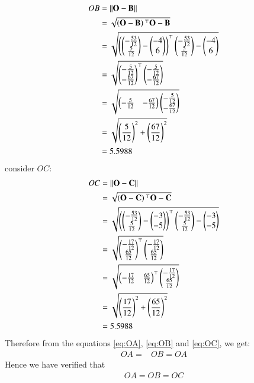 \documentclass[journal,12pt,twocolumn]{IEEEtran}
\theoremstyle{remark}
\begin{document}
\begin{align} 
OB &= \left\lVert\mathbf{O} - \mathbf{B}\right\rVert\\
&= \sqrt{\left(\mathbf{O}-\mathbf{B}\right){^\top}\mathbf{O}-\mathbf{B}}\\
&= \sqrt{\left(\begin{pmatrix}-\frac{53}{12} \\ \frac{5}{12}\end{pmatrix} - \begin{pmatrix}-4\\6\end{pmatrix}\right)^{\top}\begin{pmatrix}-\frac{53}{12}\\\frac{5}{12}\end{pmatrix} - \begin{pmatrix}-4\\6\end{pmatrix}}\\
&= \sqrt{\begin{pmatrix}-\frac{5}{12} \\ -\frac{67}{12}\end{pmatrix}^{\top}\begin{pmatrix}-\frac{5}{12} \\ -\frac{67}{12}\end{pmatrix}}\\
&= \sqrt{\begin{pmatrix}-\frac{5}{12} & -\frac{67}{12}\end{pmatrix} \begin{pmatrix}-\frac{5}{12} \\ -\frac{67}{12}\end{pmatrix}}\\
&= \sqrt{\left(\frac{5}{12}\right)^2 + \left(\frac{67}{12}\right)^2}\\
&= 5.5988 \label{eq:OB}
\end{align}
consider $OC$:
\begin{align} 
OC &= \left\lVert\mathbf{O} - \mathbf{C}\right\rVert\\
&= \sqrt{\left(\mathbf{O}-\mathbf{C}\right){^\top}\mathbf{O}-\mathbf{C}}\\
&= \sqrt{\left(\begin{pmatrix}-\frac{53}{12} \\ \frac{5}{12}\end{pmatrix} - \begin{pmatrix}-3\\-5\end{pmatrix}\right)^{\top}\begin{pmatrix}-\frac{53}{12}\\\frac{5}{12}\end{pmatrix} - \begin{pmatrix}-3\\-5\end{pmatrix}}\\
&= \sqrt{\begin{pmatrix}-\frac{17}{12} \\ \frac{65}{12}\end{pmatrix}^{\top}\begin{pmatrix}-\frac{17}{12} \\ \frac{65}{12}\end{pmatrix}}\\
&= \sqrt{\begin{pmatrix}-\frac{17}{12} & \frac{65}{12}\end{pmatrix}^{\top}\begin{pmatrix}-\frac{17}{12} \\ \frac{65}{12}\end{pmatrix}}\\
&= \sqrt{\left(\frac{17}{12}\right)^2 + \left(\frac{65}{12}\right)^2}\\
&= 5.5988 \label{eq:OC}
\end{align}
Therefore from the equations \eqref{eq:OA}, \eqref{eq:OB} and \eqref{eq:OC}, we get:
\begin{align}
OA = &OB = OA
\end{align}
Hence we have verified that \begin{align} OA = OB = OC \end{align}
\end{document}
